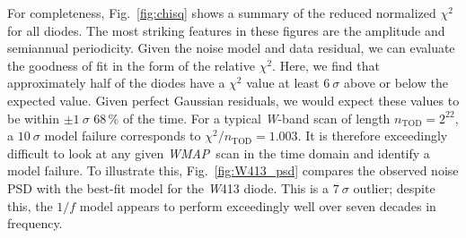 \documentclass[twocolumn]{../../common/aa}
\def\WMAP{\emph{WMAP}}
\newcommand{\W}[0]{\textit W}
\begin{document}
For completeness, Fig.~\ref{fig:chisq} shows a summary of the reduced
normalized $\chi^2$ for all diodes. The most striking features in
these figures are the amplitude and semiannual periodicity.  Given
the noise model and data residual, we can evaluate the goodness of fit
in the form of the relative $\chi^2$. Here, we find that approximately
half of the diodes have a $\chi^2$ value at least $6~\sigma$ above
or below the expected value.  Given perfect Gaussian residuals, we
would expect these values to be within $\pm1~\sigma$ 68\,\% of the time. For
a typical \W-band scan of length $n_\mathrm{TOD}=2^{22}$, a $10~\sigma$
model failure corresponds to $\chi^2/n_\mathrm{TOD}=1.003$. It is
therefore exceedingly difficult to look at any given \WMAP\ scan in
the time domain and identify a model failure. To illustrate this,
Fig.~\ref{fig:W413_psd} compares the observed noise PSD with the
best-fit model for the \W413 diode. This is a $7~\sigma$ outlier;
despite this, the $1/f$ model appears to perform exceedingly well over
seven decades in frequency.
\end{document}
